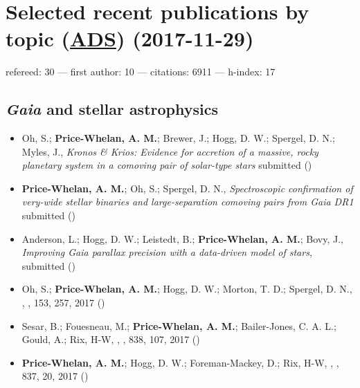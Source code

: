 \documentclass[12pt,letterpaper]{article}
\begin{document}
\section*{Selected recent publications by topic (\href{\adsurl}{ADS}) (2017-11-29)}
    refereed: 30 ---
    first author: 10 ---
    citations: 6911 ---
    h-index: 17

    \vspace{1em}

	\subsection*{\textbf{\textit{Gaia}} and stellar astrophysics}
	\begin{itemize}

\item Oh, S.; {\bf Price-Whelan, A. M.}; Brewer, J.; Hogg, D. W.; Spergel, D. N.; Myles, J.,
    {\it Kronos \& Krios: Evidence for accretion of a massive, rocky planetary system in a comoving pair of solar-type stars}
    submitted ()

\item {\bf Price-Whelan, A. M.}; Oh, S.; Spergel, D. N.,
    {\it Spectroscopic confirmation of very-wide stellar binaries and large-separation comoving pairs from Gaia DR1}
    submitted ()

\item Anderson, L.; Hogg, D. W.; Leistedt, B.; {\bf Price-Whelan, A. M.}; Bovy, J.,
    {\it Improving Gaia parallax precision with a data-driven model of stars},
    submitted ()

\item Oh, S.; {\bf Price-Whelan, A. M.}; Hogg, D. W.; Morton, T. D.; Spergel, D. N.,
    ,
    \aj, 153, 257, 2017 ()

\item Sesar, B.; Fouesneau, M.; {\bf Price-Whelan, A. M.}; Bailer-Jones, C. A. L.; Gould, A.; Rix, H-W,
    ,
    \apj, 838, 107, 2017 ()

\item {\bf Price-Whelan, A. M.}; Hogg, D. W.; Foreman-Mackey, D.; Rix, H-W,
    ,
    \apj, 837, 20, 2017 ()

    \end{itemize}
\end{document}
